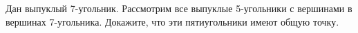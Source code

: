 \documentclass[a4paper, 12pt]{article}
\begin{document}
Дан выпуклый 7-угольник. Рассмотрим все выпуклые 5-угольники с вершинами в  вершинах 7-угольника. Докажите, что эти пятиугольники имеют общую точку.


%
%
%
%
 

\end{document}

